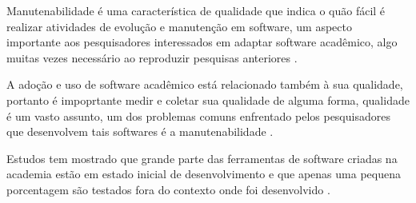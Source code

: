
Manutenabilidade é uma característica de qualidade que indica o quão fácil é
realizar atividades de evolução e manutenção em software, um aspecto
importante aos pesquisadores interessados em adaptar software acadêmico, algo
muitas vezes necessário ao reproduzir pesquisas anteriores \cite{Peng2011}.

A adoção e uso de software acadêmico está relacionado
também à sua qualidade, portanto é impoprtante medir e coletar sua qualidade de
alguma forma, qualidade é um vasto assunto, um dos problemas comuns enfrentado
pelos pesquisadores que desenvolvem tais softwares é a manutenabilidade
\cite{Prlic2012}.

Estudos tem mostrado que grande parte das ferramentas de software criadas na
academia estão em estado inicial de desenvolvimento \cite{marshall2013tools} e
que apenas uma pequena porcentagem são testados fora do contexto onde foi
desenvolvido \cite{Portillo12}.





%

